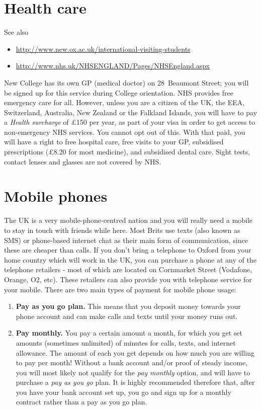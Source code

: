 \section{Health care}
See also 
\begin{itemize}
  \item \url{http://www.new.ox.ac.uk/international-visiting-students}
  \item \url{http://www.nhs.uk/NHSENGLAND/Pages/NHSEngland.aspx}
\end{itemize}

New College has its own GP (medical doctor) on 28~Beaumont Street; you will be signed up for this service during College orientation.  
NHS provides free emergency care for all. However, unless you are a citizen of
the UK, the EEA, Switzerland, Australia, New Zealand or the Falkland Islands,
you will have to pay a \emph{Health surcharge} of \pounds150 per year, as part of
your visa in order to get access to non-emergency NHS services. You cannot opt out of this.
With that paid, you will have a right to free hospital care, free visits to your
GP, subsidised prescriptions (\pounds8.20 for most medicine), and subsidised
dental care. Sight tests, contact lenses and glasses are not covered by NHS.


\section{Mobile phones} 

The UK is a very mobile-phone-centred nation and you will really need a mobile to stay in touch with friends while here. Most Brits use texts (also known as SMS) or phone-based internet chat as their main form of communication, since these are cheaper than calls. 
If you don't bring a telephone to Oxford from your home country which will work in the UK, you can purchase a phone at any of the telephone retailers - most of which are located on Cornmarket Street (Vodafone, Orange, O2, etc). These retailers can also provide you with telephone service for your mobile. There are two main types of payment for mobile phone usage:

\begin{enumerate}
  \item \textbf{Pay as you go plan.} This means that you deposit money
towards your phone account and can make calls and texts until your money runs out.
 \item \textbf{Pay monthly.}  You pay a certain amount a month, for which you
get set amounts (sometimes unlimited) of minutes for calls, texts, and internet
allowance. The amount of each you get depends on how much you are willing to pay
per month! Without a bank account and/or proof of steady income, you will most
likely not qualify for the \emph{pay monthly} option, and will have to purchase a
\emph{pay as you go} plan. It is highly recommended therefore that, after you
have your bank account set up, you go and sign up for a monthly contract rather than a pay as you go plan.
\end{enumerate}


